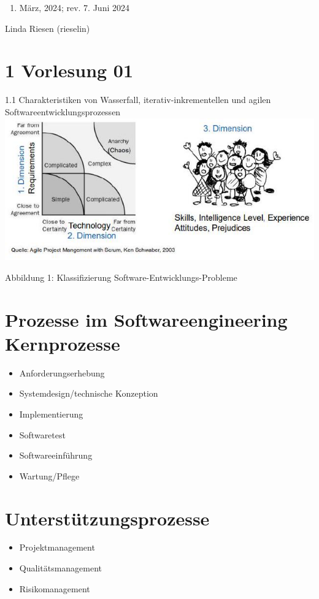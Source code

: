 \documentclass[10pt]{article}
\begin{document}
\begin{enumerate}
  \item März, 2024; rev. 7. Juni 2024
\end{enumerate}

Linda Riesen (rieselin)

\section*{1 Vorlesung 01}
1.1 Charakteristiken von Wasserfall, iterativ-inkrementellen und agilen Softwareentwicklungsprozessen\\
\includegraphics[max width=\textwidth, center]{2024_12_29_0d1d7b5551ea1b4b41bdg-01}

Abbildung 1: Klassifizierung Software-Entwicklungs-Probleme

\section*{Prozesse im Softwareengineering Kernprozesse}
\begin{itemize}
  \item Anforderungserhebung
  \item Systemdesign/technische Konzeption
  \item Implementierung
  \item Softwaretest
  \item Softwareeinführung
  \item Wartung/Pflege
\end{itemize}

\section*{Unterstützungsprozesse}
\begin{itemize}
  \item Projektmanagement
  \item Qualitätsmanagement
  \item Risikomanagement
\end{itemize}
\end{document}
